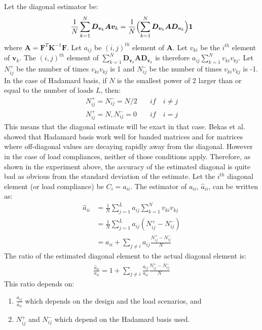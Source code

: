 Let the diagonal estimator be:
\begin{align}
\frac{1}{N} \sum_{k = 1}^N \bm{D}_{\bm{v}_k} \bm{A} \bm{v}_k = 
\frac{1}{N} \Bigl(\sum_{k = 1}^N \bm{D}_{\bm{v}_k} \bm{A} \bm{D}_{\bm{v}_k} \Bigr) \bm{1}
\end{align}
where $\bm{A} = \bm{F}^T \bm{K}^{-1} \bm{F}$. Let $a_{ij}$ be $(i,j)^{th}$ element of $\bm{A}$. Let $v_{ki}$ be the $i^{th}$ element of $\bm{v}_k$. The $(i,j)^{th}$ element of $\sum_{k = 1}^N \bm{D}_{\bm{v}_k} \bm{A} \bm{D}_{\bm{v}_k}$ is therefore $a_{ij} \sum_{k=1}^N v_{ki}v_{kj}$. Let $N^+_{ij}$ be the number of times $v_{ki}v_{kj}$ is 1 and $N^-_{ij}$ be the number of times $v_{ki}v_{kj}$ is -1. In the case of Hadamard basis, if $N$ is the smallest power of 2 larger than or equal to the number of loads $L$, then:
\begin{align}
  N^+_{ij} = N^-_{ij} = N/2 & \quad \textit{if} \quad i \neq j \\
  N^+_{ij} = N, N^-_{ij} = 0 & \quad \textit{if} \quad i = j
\end{align}
This means that the diagonal estimate will be exact in that case. Bekas et al. \cite{Bekas2007} showed that Hadamard basis work well for banded matrices and for matrices where off-diagonal values are decaying rapidly away from the diagonal. However in the case of load compliances, neither of those conditions apply. Therefore, as shown in the experiment above, the accuracy of the estimated diagonal is quite bad as obvious from the standard deviation of the estimate. Let the $i^{th}$ diagonal element (or load compliance) be $C_i = a_{ii}$. The estimator of $a_{ii}$, $\hat{a}_{ii}$, can be written as:
\begin{align}
  \hat{a}_{ii} & = \frac{1}{N} \sum_{j=1}^L a_{ij} \sum_{k=1}^N v_{ki}v_{kj} \\
  & = \frac{1}{N} \sum_{j=1}^L a_{ij} (N^+_{ij} - N^-_{ij}) \\
  & = a_{ii} + \sum_{j \neq i} a_{ij} \frac{N^+_{ij} - N^-_{ij}}{N}
\end{align}
The ratio of the estimated diagonal element to the actual diagonal element is:
\begin{align}
  \frac{\hat{a}_{ii}}{a_{ii}} = 1 + \sum_{j \neq i} \frac{a_{ij}}{a_{ii}} \frac{N^+_{ij} - N^-_{ij}}{N}
\end{align}
This ratio depends on:
\begin{enumerate}
  \item $\frac{a_{ij}}{a_{ii}}$ which depends on the design and the load scenarios, and
  \item $N^+_{ij}$ and $N^-_{ij}$ which depend on the Hadamard basis used. 
\end{enumerate}
